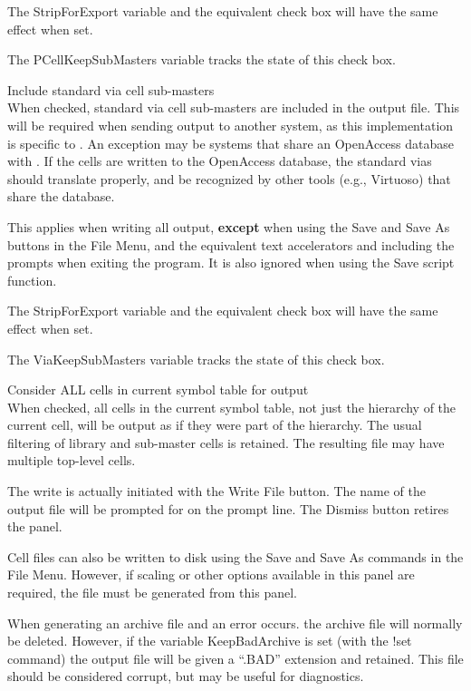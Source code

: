 \begin{description}
The {\et StripForExport} variable and the equivalent check box will
have the same effect when set.

The {\et PCellKeepSubMasters} variable tracks the state of this check
box.

\item{\cb Include standard via cell sub-masters}\\
When checked, standard via cell sub-masters are included in the output
file.  This will be required when sending output to another system, as
this implementation is specific to {\Xic}.
An exception may be systems that share an OpenAccess database with
{\Xic}.  If the cells are written to the OpenAccess database, the
standard vias should translate properly, and be recognized by other
tools (e.g., Virtuoso) that share the database.

This applies when writing all output, {\bf except} when using the {\cb
Save} and {\cb Save As} buttons in the {\cb File Menu}, and the
equivalent text accelerators and including the prompts when exiting
the program.  It is also ignored when using the {\vt Save} script
function.

The {\et StripForExport} variable and the equivalent check box will
have the same effect when set.

The {\et ViaKeepSubMasters} variable tracks the state of this check
box.

\item{\cb Consider ALL cells in current symbol table for output}\\
When checked, all cells in the current symbol table, not just the
hierarchy of the current cell, will be output as if they were part of
the hierarchy.  The usual filtering of library and sub-master cells is
retained.  The resulting file may have multiple top-level cells.
\end{description}

The write is actually initiated with the {\cb Write File} button.  The
name of the output file will be prompted for on the prompt line.  The
{\cb Dismiss} button retires the panel.

Cell files can also be written to disk using the {\cb Save} and {\cb
Save As} commands in the {\cb File Menu}.  However, if scaling or
other options available in this panel are required, the file must be
generated from this panel.

When generating an archive file and an error occurs.  the archive file
will normally be deleted.  However, if the variable {\et
KeepBadArchive} is set (with the {\cb !set} command) the output file
will be given a ``{\vt .BAD}'' extension and retained.  This file
should be considered corrupt, but may be useful for diagnostics.


